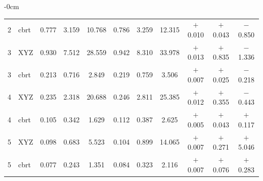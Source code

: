 \begin{table}[H]
\begin{adjustwidth}{-\extralength}{0cm}
\begin{tabular}{@{}llccccccccc@{}}
2 & cbrt & 0.777 & 3.159 & 10.768 & 0.786 & 3.259 & 12.315 & $+$0.010 & $+$0.043 & $-$0.850 \\
3 & XYZ & 0.930 & 7.512 & 28.559 & 0.942 & 8.310 & 33.978 & $+$0.013 & $+$0.835 & $-$1.336 \\
3 & cbrt & 0.213 & 0.716 & 2.849 & 0.219 & 0.759 & 3.506 & $+$0.007 & $+$0.025 & $-$0.218 \\
4 & XYZ & 0.235 & 2.318 & 20.688 & 0.246 & 2.811 & 25.385 & $+$0.012 & $+$0.355 & $-$0.443 \\
4 & cbrt & 0.105 & 0.342 & 1.629 & 0.112 & 0.387 & 2.625 & $+$0.005 & $+$0.043 & $+$0.117 \\
5 & XYZ & 0.098 & 0.683 & 5.523 & 0.104 & 0.899 & 14.065 & $+$0.007 & $+$0.271 & $+$5.046 \\
5 & cbrt & 0.077 & 0.243 & 1.351 & 0.084 & 0.323 & 2.116 & $+$0.007 & $+$0.076 & $+$0.283 \\
\bottomrule
\end{tabular}
\end{adjustwidth}
\end{table}

